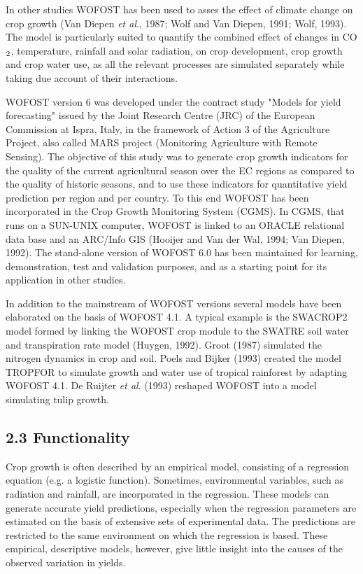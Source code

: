 \documentclass[11pt]{article}
\begin{document}
\bigskip
In other studies WOFOST has been used to asses the effect of climate change on crop
growth (Van Diepen {\it et al\/}., 1987; Wolf and Van Diepen, 1991; Wolf, 1993). The model
is particularly suited to quantify the com\-bined effect of changes in CO$_{{\rm 2}}$, tempera\-ture,
rainfall and solar radiation, on crop development, crop growth and crop water use, as all
the relevant processes are simulated separately while taking due account of their interac\-tions.

\bigskip
WOFOST version 6 was developed under the contract study {\nobreak}"Models for yield forecast\-ing" issued by the Joint Research Centre (JRC) of the European Commission at Ispra,
Italy, in the framework of Action 3 of the Agriculture Project, also called MARS project
(Monitoring Agriculture with Remote Sens\-ing). The objective of this study was to
generate crop growth indicators for the quality of the current agricultural season over the
EC regions as compared to the quality of historic seasons, and to use these indicators for
quantitative yield prediction per region and per country. To this end WOFOST has been
incorporated in the Crop Growth Monitoring System (CGMS). In CGMS, that runs on a
SUN-UNIX computer, WOFOST is linked to an ORACLE relational data base and an
ARC/Info GIS (Hooijer and Van der Wal, 1994; Van Diepen, 1992). The stand-alone
version of WOFOST 6.0 has been maintained for learning, demon\-stration, test and
validation purposes, and as a starting point for its application in other studies.

\bigskip
In addition to the mainstream of WOFOST versions several models have been elaborated
on the basis of WOFOST 4.1. A typical example is the SWACROP2 model formed by
linking the WOFOST crop module to the SWATRE soil water and transpiration rate
model (Huygen, 1992). Groot (1987) simulated the nitrogen dynamics in crop and soil.
Poels and Bijker (1993) created the model TROPFOR to simulate growth and water use
of tropical rainforest by adapting WOFOST 4.1. De Ruijter {\it et al\/}. (1993) reshaped
WOFOST into a model simulating tulip growth.

\bigskip
\bigskip
\bigskip
\bigskip
\bigskip
\bigskip
\bigskip
\bigskip

\subsection{  2.3 Functionality  }

Crop growth is often described by an empirical model, consisting of a regression equation
(e.g. a logistic function). Sometimes, environmental variables, such as radiation and
rainfall, are incorporated in the regression. These models can generate accurate yield
predictions, especially when the regression parameters are estimated on the basis of
extensive sets of experimental data. The predictions are restricted to the same environ\-ment on which the regression is based. These empirical, descriptive models, however,
give little insight into the causes of the observed variation in yields.  
\end{document}
